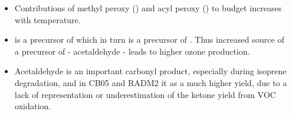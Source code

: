 \begin{GreyBox}
\begin{block}{}
\begin{columns}[c]
\begin{WhiteBox}
\begin{itemize}
                    \end{itemize}
                \end{WhiteBox}
                \begin{WhiteBox} \vspace{3mm}
                    \begin{itemize}
                        \item Contributions of methyl peroxy () and acyl peroxy () to  budget increases with temperature.\vspace{9mm}
                        \item {} is a precursor of  which in turn is a precursor of . Thus increased source of a precursor of  - acetaldehyde - leads to higher ozone production.\vspace{9mm}
                        \item Acetaldehyde is an important carbonyl product, especially during isoprene degradation, and in CB05 and RADM2 it as a much higher yield, due to a lack of representation or underestimation of the ketone yield from VOC oxidation.\vspace{9mm}
                    \end{itemize}
                \end{WhiteBox}
        \end{columns}
    \end{block}
\end{GreyBox}

